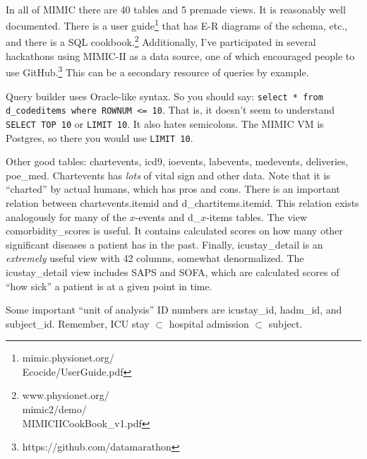 \documentclass{tufte-handout}
\begin{document}
~\\

In all of MIMIC there are 40 tables and 5 premade views. It is
reasonably well documented. There is a user
guide\footnote{mimic.physionet.org/\\Ecocide/UserGuide.pdf} that has
E-R diagrams of the schema, etc., and there is a SQL
cookbook.\footnote{www.physionet.org/\\mimic2/demo/\\MIMICIICookBook\_v1.pdf}
Additionally, I've participated in several hackathons using MIMIC-II
as a data source, one of which encouraged people to use
GitHub.\footnote{https://github.com/datamarathon} This can be a
secondary resource of queries by example.

Query builder uses Oracle-like syntax. So you should say:
\texttt{select * from d\_codeditems where ROWNUM <= 10}. That is, it
doesn't seem to understand \texttt{SELECT TOP 10} or \texttt{LIMIT
  10}. It also hates semicolons. The MIMIC VM is Postgres, so there
you would use \texttt{LIMIT 10}. 

Other good tables: chartevents, icd9, ioevents, labevents, medevents,
deliveries, poe\_med. Chartevents has \emph{lots} of vital sign and
other data. Note that it is ``charted'' by actual humans, which has
pros and cons. There is an important relation between
chartevents.itemid and d\_chartitems.itemid. This relation exists
analogously for many of the $x$-events and d\_$x$-items tables. The
view comorbidity\_scores is useful. It contains calculated scores on
how many other significant diseases a patient has in the past.
Finally, icustay\_detail is an \emph{extremely} useful view with 42
columns, somewhat denormalized. The icustay\_detail view includes SAPS
and SOFA, which are calculated scores of ``how sick'' a patient is at
a given point in time.

Some important ``unit of analysis'' ID numbers are icustay\_id,
hadm\_id, and subject\_id. Remember, ICU stay $\subset$ hospital
admission $\subset$ subject. 
\end{document}

